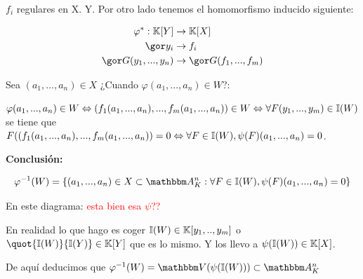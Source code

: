 $f_i$ regulares en X.
Y. Por otro lado tenemos el homomorfismo inducido siguiente:

\begin{align*}
\varphi^*: \K[Y] & \rightarrow \K[X] \\
\cls{y_i} & \rightarrow f_i\\
\cls{G(y_1,...,y_n)} & \rightarrow \cls{G(f_1,...,f_m)}
\end{align*}

Sea $(a_1,...,a_n) \in X$ ¿Cuando $\varphi(a_1,...,a_n) \in W$?:

$\varphi(a_1,...,a_n) \in W \Leftrightarrow (f_1(a_1,...,a_n),...,f_m(a_1,...,a_n)) \in W \Leftrightarrow \forall F(y_1,...,y_m) \in \mathbb{I}(W)$ se tiene que $F((f_1(a_1,...,a_n),...,f_m(a_1,...,a_n))=0 \Leftrightarrow \forall F \in \mathbb{I}(W), \psi(F)(a_1,...,a_n)=0$.

\textbf{Conclusión:}

$$ \varphi^{-1}(W)=\left\{ (a_1,...,a_n) \in X \subset \Akn: \forall F \in \I(W), \psi(F)(a_1,...,a_n)=0 \right\} $$

En este diagrama: \textcolor{red}{esta bien esa $\psi$??}



En realidad lo que hago es coger $\mathbb{I}(W) \in \mathbb{K}[y_1,..,y_m]$ o $\quot{\I(W)}{\I(Y)} \in \K[Y]$ que es lo mismo. Y los llevo a $\psi(\mathbb{I}(W)) \in \mathbb{K}[X]$.

De aquí deducimos que $\varphi^{-1}(W)=\V(\psi(\I(W))) \subset \Akn$


